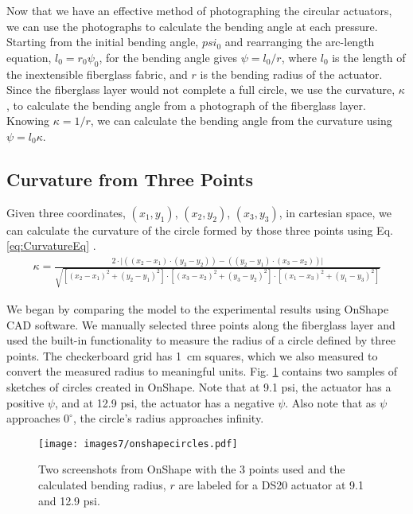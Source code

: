 Now that we have an effective method of photographing the circular actuators, we can use the photographs to calculate the bending angle at each pressure. Starting from the initial bending angle, $psi_0$ and rearranging the arc-length equation, $l_{0} = r_{0}\psi_{0}$, for the bending angle gives $\psi = l_0/r$, where $l_0$ is the length of the inextensible fiberglass fabric, and $r$ is the bending radius of the actuator. Since the fiberglass layer would not complete a full circle, we use the curvature, $\kappa$, to calculate the bending angle from a photograph of the fiberglass layer. Knowing $\kappa = 1/r$, we can calculate the bending angle from the curvature using $\psi = l_{0}\kappa$. 

\subsection{Curvature from Three Points}

Given three coordinates, $(x_1,y_1)$, $(x_2,y_2)$, $(x_3,y_3)$, in cartesian space, we can calculate the curvature of the circle formed by those three points using Eq. \ref{eq:CurvatureEq} \cite{ratliff_cartesian_2019}. 
\begin{align} 
    \kappa = \frac{2\cdot\lvert((x_2-x_1)\cdot(y_3-y_2)) - ((y_2-y_1)\cdot(x_3-x_2))\rvert}{\sqrt{[(x_2-x_1)^2+(y_2-y_1)^2] \cdot [(x_3-x_2)^2+(y_3-y_2)^2] \cdot [(x_1-x_3)^2+(y_1-y_3)^2]}} 
    \label{eq:CurvatureEq} 
\end{align}

We began by comparing the model to the experimental results using OnShape CAD software. We manually selected three points along the fiberglass layer and used the built-in functionality to measure the radius of a circle defined by three points. The checkerboard grid has 1~cm squares, which we also measured to convert the measured radius to meaningful units. Fig. \ref{fig:onshapecircles} contains two samples of sketches of circles created in OnShape. Note that at 9.1 psi, the actuator has a positive $\psi$, and at 12.9 psi, the actuator has a negative $\psi$. Also note that as $\psi$ approaches $0^\circ$, the circle's radius approaches infinity. 

\begin{figure}[ht]
    \centering
     \texttt{[image: images7/onshapecircles.pdf]}
    \caption{Two screenshots from OnShape with the 3 points used and the calculated bending radius, $r$ are labeled for a DS20 actuator at 9.1 and 12.9 psi.}
    \label{fig:onshapecircles}
\end{figure}

